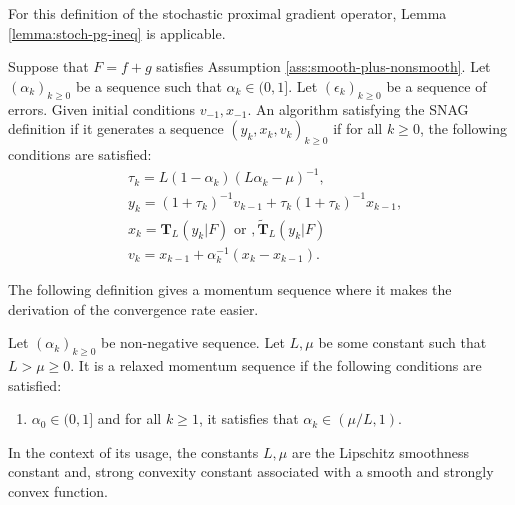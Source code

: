 \documentclass[12pt]{article}
\begin{document}
    \begin{remark}
        For this definition of the stochastic proximal gradient operator, Lemma \ref{lemma:stoch-pg-ineq} is applicable. 
    \end{remark}
    \begin{definition}\label{def:SNAG}
        Suppose that $F = f + g$ satisfies Assumption \ref{ass:smooth-plus-nonsmooth}. 
        Let $(\alpha_k)_{k \ge 0}$ be a sequence such that $\alpha_k \in (0, 1]$. 
        Let $(\epsilon_k)_{k \ge 0}$ be a sequence of errors. 
        Given initial conditions $v_{-1}, x_{- 1}$. 
        An algorithm satisfying the SNAG definition if it generates a sequence $(y_k, x_k, v_k)_{k \ge 0}$ if for all $k \ge 0$, the following conditions are satisfied: 
        \begin{align*}
            & \tau_k = L(1 - \alpha_k)\left(L \alpha_k - \mu\right)^{-1}, \\
            & y_k = (1 + \tau_k)^{-1}v_{k - 1} + \tau_k(1 + \tau_k)^{-1}x_{k - 1}, \\
            & x_k =  \mathbf T_{L}(y_k | F) \text{ or }, \mathbf{\widetilde T}_L(y_k | F)\\
            & v_k = x_{k - 1} + \alpha_k^{-1}(x_k - x_{k - 1}).
        \end{align*}
    \end{definition}
    The following definition gives a momentum sequence where it makes the derivation of the convergence rate easier. 
    \begin{definition}\label{def:relax-momen-seq}
        Let $(\alpha_k)_{k \ge 0}$ be non-negative sequence. 
        Let $L, \mu$ be some constant such that $L > \mu \ge 0$. 
        It is a relaxed momentum sequence if the following conditions are satisfied: 
        \begin{enumerate}[nosep]
            \item $\alpha_0 \in (0, 1]$ and for all $k \ge 1$, it satisfies that $\alpha_k \in (\mu/L, 1)$. 
        \end{enumerate}
    \end{definition}
    \begin{remark}
        In the context of its usage, the constants $L, \mu$ are the Lipschitz smoothness constant  and, strong convexity constant associated with a smooth and strongly convex function. 
    \end{remark}
    
\end{document}

